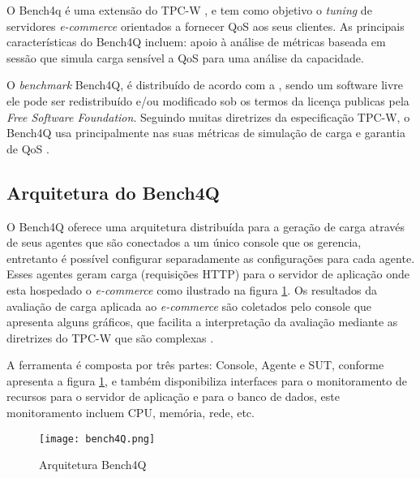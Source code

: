 O Bench4q é uma extensão do TPC-W \cite{Menasce2002}, e tem como objetivo o \textit{tuning} de servidores \textit{e-commerce} orientados a fornecer QoS aos seus clientes. As principais características do Bench4Q incluem: 
apoio à análise de métricas baseada em sessão que simula carga sensível a QoS para uma análise da capacidade. 

O \textit{benchmark} Bench4Q, é distribuído de acordo com a , sendo um software livre ele pode ser redistribuído e/ou modificado sob os termos da licença publicas pela \textit{Free Software Foundation}. Seguindo muitas diretrizes da especificação TPC-W, o Bench4Q usa principalmente nas suas métricas de simulação de carga e garantia de QoS \cite{Bench4Q}. 




\subsection{Arquitetura do Bench4Q}

O Bench4Q oferece uma arquitetura distribuída para a geração de carga através de seus agentes que são conectados a um único console que os gerencia, entretanto é possível configurar separadamente as configurações para cada agente. Esses agentes geram carga (requisições HTTP) para o servidor de aplicação onde esta hospedado o \textit{e-commerce} como ilustrado na figura \ref{fig:arquitetura-bench4q}. Os resultados da avaliação de carga aplicada ao \textit{e-commerce} são coletados pelo console que apresenta alguns gráficos, que facilita a interpretação da avaliação mediante as diretrizes do TPC-W que são complexas \cite{Bench4Q}.

A ferramenta é composta por três partes: Console, Agente e SUT, conforme apresenta a figura \ref{fig:arquitetura-bench4q}, e também disponibiliza interfaces para o monitoramento de recursos para o servidor de aplicação e para o banco de dados, este monitoramento incluem CPU, memória, rede, etc.


\begin{figure}[htb]
	\caption{Arquitetura Bench4Q}
	\label{fig:arquitetura-bench4q}
	\centering
	\texttt{[image: bench4Q.png]}
\end{figure}

